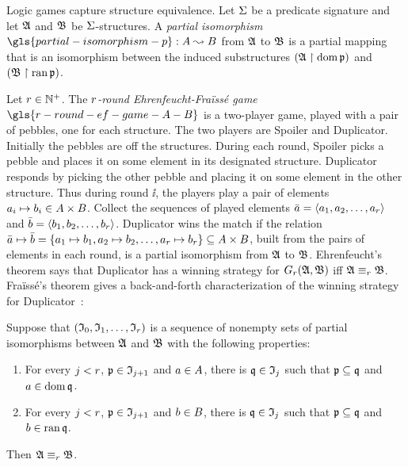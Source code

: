 Logic games capture structure equivalence.
Let $\mathrm{\Sigma}$ be a predicate signature and let $\mathfrak{A}$ and $\mathfrak{B}$ be
$\mathrm{\Sigma}$-structures.
A \emph{partial isomorphism} $\gls{partial-isomorphism-p} : \domA \pto \domB$
from $\mathfrak{A}$ to $\mathfrak{B}$ is a partial mapping that is an isomorphism between the 
induced substructures $(\mathfrak{A} \restriction \operatorname{dom} \mathfrak{p})$ and 
$(\mathfrak{B} \restriction \operatorname{ran} \mathfrak{p})$.

Let $r \in \mathbb{N}^{+}$.
The \emph{$r$-round Ehrenfeucht-Fra\"{i}ss\'{e} game}
$\gls{r-round-ef-game-A-B}$ is a two-player game, played with a pair of pebbles,
one for each structure. The two players are Spoiler and Duplicator.
Initially the pebbles are off the structures.
During each round, Spoiler picks a pebble
and places it on some element in its designated structure.
Duplicator responds by picking the other pebble and placing it on some
element in the other structure. Thus during round $\ii$, the players play a pair
of elements $a_{i} \mapsto b_{i} \in A \times B$. 
Collect the sequences of played elements $\bar{a} = \left\langle a_{1}, a_{2}, \dots,
a_{r} \right\rangle$ and $\bar{b} = \left\langle b_{1}, b_{2}, \dots, b_{r} \right\rangle$.
Duplicator wins the match if the
relation $\bar{a} \mapsto \bar{b} = \left\{a_{1} \mapsto b_{1}, a_{2} \mapsto
b_{2}, \dots, a_{r} \mapsto b_{r}\right\} \subseteq A \times B$, built from
the pairs of elements in each round, is a partial isomorphism from $\mathfrak{A}$ to
$\mathfrak{B}$.
Ehrenfeucht's theorem says that Duplicator has a winning strategy for
$G_{r}(\mathfrak{A},\mathfrak{B})$ iff $\mathfrak{A} \equiv_{r} \mathfrak{B}$.
Fra\"{i}ss\'{e}'s theorem gives a back-and-forth characterization of the winning
strategy for Duplicator~\cite[ch. 2]{ebbinghaus1999finite}:
\begin{theorem}\label{thm:game-ef}
Suppose that $(\mathfrak{I}_{0}, \mathfrak{I}_{1}, \dots, \mathfrak{I}_{r})$ is a sequence of nonempty
sets of partial isomorphisms between $\mathfrak{A}$ and $\mathfrak{B}$ with the following
properties:
\begin{enumerate}
  \item For every $j < r$, $\mathfrak{p} \in \mathfrak{I}_{j+1}$ and $a \in A$,
  there is $\mathfrak{q} \in \mathfrak{I}_{j}$ such that $\mathfrak{p} \subseteq \mathfrak{q}$ and
  $a \in \operatorname{dom}\mathfrak{q}$.
  \item For every $j < r$, $\mathfrak{p} \in \mathfrak{I}_{j+1}$ and $b \in B$,
  there is $\mathfrak{q} \in \mathfrak{I}_{j}$ such that $\mathfrak{p} \subseteq \mathfrak{q}$ and 
  $b \in \operatorname{ran}\mathfrak{q}$.
\end{enumerate}
Then $\mathfrak{A} \equiv_{r} \mathfrak{B}$.
\end{theorem}

